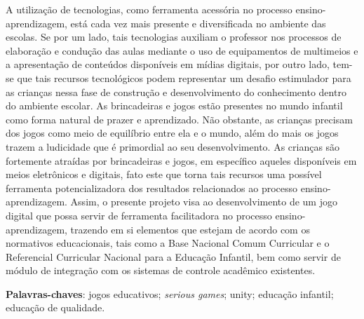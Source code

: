\documentclass[article,12pt,openany,oneside,a4paper,english,brazil]{abntex2}
\begin{document}
\frenchspacing 


\imprimircapa

\tableofcontents*
\newpage

\newpage
\setlength{\absparsep}{18pt} %
\begin{resumo}

A utilização de tecnologias, como ferramenta acessória no processo ensino-aprendiza\-gem, está cada vez mais presente e diversificada no ambiente das escolas. Se por um lado, tais tecnologias auxiliam o professor nos processos de elaboração e condução das aulas mediante o uso de equipamentos de multimeios e a apresentação de conteúdos disponíveis em mídias digitais, por outro lado, tem-se que tais recursos tecnológicos podem representar um desafio estimulador para as crianças nessa fase de construção e desenvolvimento do conhecimento dentro do ambiente escolar. As brincadeiras e jogos estão presentes no mundo infantil como forma natural de prazer e aprendizado. Não obstante, as crianças precisam dos jogos como meio de equilíbrio entre ela e o mundo, além do mais os jogos trazem a ludicidade que é primordial ao seu desenvolvimento. As crianças são fortemente atraídas por brincadeiras e jogos, em específico aqueles disponíveis em meios eletrônicos e digitais, fato este que torna tais recursos uma possível ferramenta potencializadora dos resultados relacionados ao processo ensino-aprendizagem. Assim, o presente projeto visa ao desenvolvimento de um jogo digital que possa servir de ferramenta facilitadora no processo ensino-aprendizagem, trazendo em si elementos que estejam de acordo com os normativos educacionais, tais como a Base Nacional Comum Curricular e o Referencial Curricular Nacional para a Educação Infantil, bem como servir de módulo de integração com os sistemas de controle acadêmico existentes.

\textbf{Palavras-chaves}: jogos educativos; \textit{serious games}; unity; educação infantil; educação de qualidade.

\end{resumo}

\end{document}
